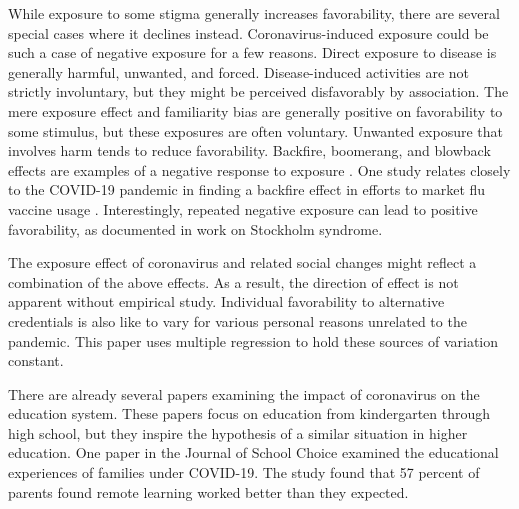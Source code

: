 While exposure to some stigma generally increases favorability, there are several special cases where it declines instead.
Coronavirus-induced exposure could be such a case of negative exposure for a few reasons.
Direct exposure to disease is generally harmful, unwanted, and forced.
Disease-induced activities are not strictly involuntary,
but they might be perceived disfavorably by association.
The mere exposure effect\cite{robinson2005novel} and familiarity bias\cite{cao2011fear}
are generally positive on favorability to some stimulus,
but these exposures are often voluntary.
Unwanted exposure that involves harm tends to reduce favorability.
Backfire, boomerang, and blowback effects are examples of a negative response to exposure
\cite{swire2020searching, byrne2009boomerang, campagna2016strategic}.
One study relates closely to the COVID-19 pandemic in finding a backfire effect in efforts to market flu vaccine usage
\cite{nyhan2015does}.
Interestingly, repeated negative exposure can lead to positive favorability,
as documented in work on Stockholm syndrome\cite{julich2005stockholm}.

The exposure effect of coronavirus and related social changes might reflect a combination of the above effects.
As a result, the direction of effect is not apparent without empirical study.
Individual favorability to alternative credentials is also like to vary for various personal reasons unrelated to the pandemic.
This paper uses multiple regression to hold these sources of variation constant.

There are already several papers examining the impact of coronavirus on the education system.
These papers focus on education from kindergarten through high school,
but they inspire the hypothesis of a similar situation in higher education.
One paper in the Journal of School Choice examined the educational experiences of families under COVID-19\cite{carpenter2020we}.
The study found that 57 percent of parents found remote learning worked better than they expected.


